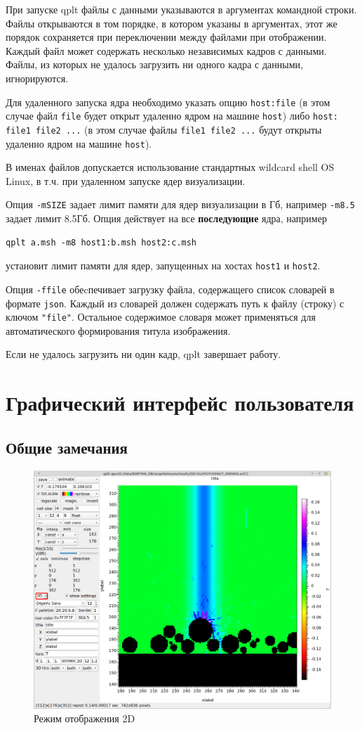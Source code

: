 \documentclass[12pt]{article}
\begin{document}
При запуске qplt файлы с данными указываются в аргументах командной строки.
Файлы открываются в том порядке, в котором указаны в аргументах, этот же порядок сохраняется при переключении между файлами при отображении.
Каждый файл может содержать несколько независимых кадров с данными. Файлы, из которых не удалось загрузить ни одного кадра с данными, игнорируются.

Для удаленного запуска ядра необходимо указать опцию \verb'host:file' (в этом случае файл \verb'file'
будет открыт удаленно ядром на машине \verb'host') либо \verb'host: file1 file2 ...' (в этом случае файлы \verb'file1 file2 ...'
будут открыты удаленно ядром на машине \verb'host'). 

В именах файлов допускается использование стандартных wildcard shell OS Linux, в т.ч. при удаленном запуске ядер визуализации.

Опция \verb'-mSIZE' задает лимит памяти для ядер визуализации в Гб, например \verb'-m8.5' задает лимит 8.5Гб. Опция действует на все
{\bf последующие} ядра, например
\begin{verbatim}
qplt a.msh -m8 host1:b.msh host2:c.msh
\end{verbatim}
установит лимит памяти для ядер, запущенных на хостах \verb'host1' и \verb'host2'.

Опция  \verb'-ffile' обеcпечивает загрузку файла, содержащего список словарей в формате \verb'json'.
Каждый из словарей должен содержать путь к файлу (строку) с ключом \verb'"file"'.
Остальное содержимое словаря может применяться для автоматического формирования титула изображения.

Если не удалось загрузить ни один кадр, qplt завершает работу.

\section{Графический интерфейс пользователя}
\subsection{Общие замечания}
\begin{figure}[hb]
  \begin{center}
      \includegraphics[width=.7\textwidth]{picts/2D.png} 
  \end{center}
  \caption{Режим отображения 2D}\label{2D:pict}
\end{figure}
\end{document}
